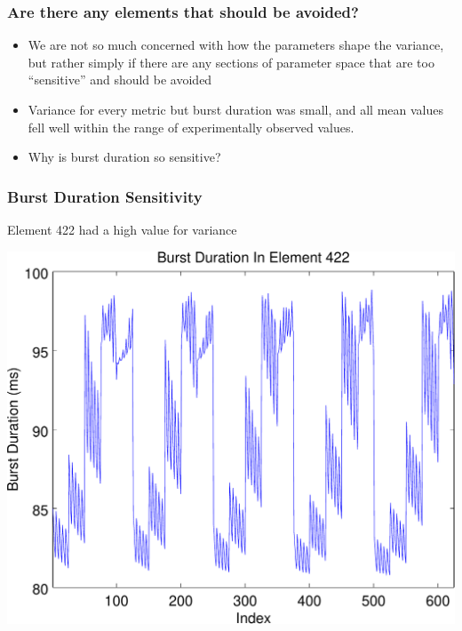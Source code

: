 \documentclass{beamer}
\theoremstyle{plain}
\theoremstyle{definition}
\begin{document}
\begin{frame}\frametitle{Are there any elements that should be avoided?}
  \begin{itemize}
    \item We are not so much concerned with how the parameters shape the variance, but rather simply if there are any sections of parameter space that are too ``sensitive'' and should be avoided
    \item Variance for every metric but burst duration was small, and all mean values fell well within the range of experimentally observed values.
    \item Why is burst duration so sensitive?
  \end{itemize}
\end{frame}

\begin{frame}\frametitle{Burst Duration Sensitivity}
  Element 422 had a high value for variance
  \begin{center}
    \includegraphics[scale=.45]{Element422.pdf}%
  \end{center}
\end{frame}
\end{document}
